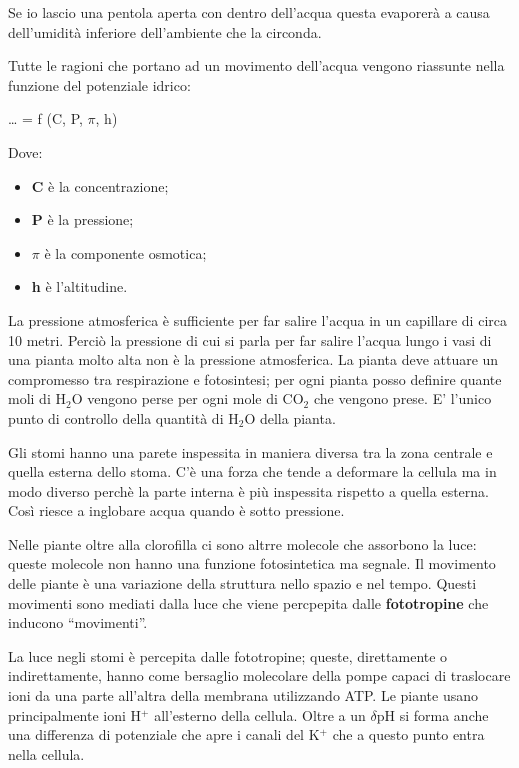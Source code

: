 \documentclass[]{article}
\begin{document}
Se io lascio una pentola aperta con dentro dell'acqua questa evaporerà a
causa dell'umidità inferiore dell'ambiente che la circonda.

Tutte le ragioni che portano ad un movimento dell'acqua vengono
riassunte nella funzione del potenziale idrico:

\ldots{} = f (C, P, $\pi$, h)

Dove:

\begin{itemize}
\itemsep1pt\parskip0pt
\item
  \textbf{C} è la concentrazione;
\item
  \textbf{P} è la pressione;
\item
  \textbf{$\pi$} è la componente osmotica;
\item
  \textbf{h} è l'altitudine.
\end{itemize}

La pressione atmosferica è sufficiente per far salire l'acqua in un
capillare di circa 10 metri. Perciò la pressione di cui si parla per far
salire l'acqua lungo i vasi di una pianta molto alta non è la pressione
atmosferica. La pianta deve attuare un compromesso tra respirazione e
fotosintesi; per ogni pianta posso definire quante moli di H$_2$O
vengono perse per ogni mole di CO$_2$ che vengono prese. E' l'unico
punto di controllo della quantità di H$_2$O della pianta.

Gli stomi hanno una parete inspessita in maniera diversa tra la zona
centrale e quella esterna dello stoma. C'è una forza che tende a
deformare la cellula ma in modo diverso perchè la parte interna è più
inspessita rispetto a quella esterna. Così riesce a inglobare acqua
quando è sotto pressione.

Nelle piante oltre alla clorofilla ci sono altrre molecole che assorbono
la luce: queste molecole non hanno una funzione fotosintetica ma
segnale. Il movimento delle piante è una variazione della struttura
nello spazio e nel tempo. Questi movimenti sono mediati dalla luce che
viene percpepita dalle \textbf{fototropine} che inducono ``movimenti''.

La luce negli stomi è percepita dalle fototropine; queste, direttamente
o indirettamente, hanno come bersaglio molecolare della pompe capaci di
traslocare ioni da una parte all'altra della membrana utilizzando ATP.
Le piante usano principalmente ioni H$^+$ all'esterno della cellula.
Oltre a un $\delta$pH si forma anche una differenza di potenziale che
apre i canali del K$^+$ che a questo punto entra nella cellula.
\end{document}
